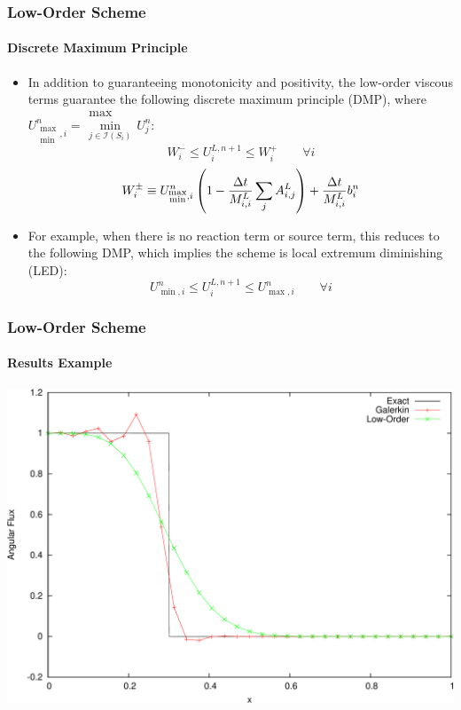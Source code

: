 \documentclass{beamer}
\begin{document}
\begin{frame}
\frametitle{Low-Order Scheme}
\framesubtitle{Discrete Maximum Principle}

\begin{itemize}
   \item In addition to guaranteeing monotonicity and positivity, the low-order
      viscous terms guarantee the following discrete maximum principle (DMP),
      where $U^n_{\substack{\max\\\min},i} =
      \substack{\max\\\min\limits_{j\in\mathcal{I}(S_i)}}U^n_j$:
      \begin{equation}
         W_i^-\leq
         U_i^{L,n+1}\leq
         W_i^+\qquad\forall i
      \end{equation}
      \begin{equation}
         W_i^\pm \equiv U_{\substack{\max\\\min},i}^n\left(
         1-\frac{\Delta t}{M_{i,i}^L}
         \sum\limits_j A_{i,j}^L\right)
         + \frac{\Delta t}{M_{i,i}^L}b_i^n
      \end{equation}
   \item For example, when there is no reaction term or source term, this reduces
      to the following DMP, which implies the scheme is local extremum
      diminishing (LED):
      \begin{equation}
         U^n_{\min,i}\leq
         U_i^{L,n+1}\leq
         U^n_{\max,i}\qquad\forall i
      \end{equation}
\end{itemize}

\end{frame}
\begin{frame}
\frametitle{Low-Order Scheme}
\framesubtitle{Results Example}

\includegraphics[width=\textwidth]{./figures/advection_low_order.pdf}

\end{frame}
\end{document}
